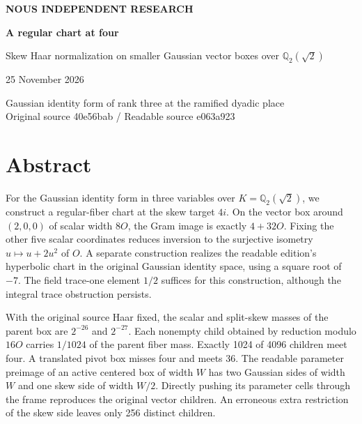 \documentclass[12pt,letterpaper]{article}
\begin{document}
\thispagestyle{empty}
\begin{center}\vspace*{.46in}
{\sffamily\small\bfseries\color{accent}NOUS INDEPENDENT RESEARCH}\par\vspace{.51in}
{\fontsize{32}{38}\selectfont\bfseries\color{ink}A regular chart at four}\par\vspace{.24in}
\begin{minipage}{.91\linewidth}\centering\Large Skew Haar normalization on smaller Gaussian vector boxes over $\mathbb Q_2(\sqrt2)$\end{minipage}
\par\vspace{.35in}
\par\vspace{.45in}{\large Justin Candler with Uriel, AI research assistant}\par 25 November 2026
\end{center}\vfill
\begin{center}\small\sffamily Gaussian identity form of rank three at the ramified dyadic place\\
Original source 40e56bab \enspace / \enspace Readable source e063a923\end{center}
\clearpage
\section*{Abstract}
For the Gaussian identity form in three variables over $K=\mathbb Q_2(\sqrt2)$, we construct a regular-fiber chart at the skew target $4i$. On the vector box around $(2,0,0)$ of scalar width $8O$, the Gram image is exactly $4+32O$. Fixing the other five scalar coordinates reduces inversion to the surjective isometry $u\mapsto u+2u^2$ of $O$. A separate construction realizes the readable edition's hyperbolic chart in the original Gaussian identity space, using a square root of $-7$. The field trace-one element $1/2$ suffices for this construction, although the integral trace obstruction persists.

With the original source Haar fixed, the scalar and split-skew masses of the parent box are $2^{-26}$ and $2^{-27}$. Each nonempty child obtained by reduction modulo $16O$ carries $1/1024$ of the parent fiber mass. Exactly 1024 of 4096 children meet four. A translated pivot box misses four and meets 36. The readable parameter preimage of an active centered box of width $W$ has two Gaussian sides of width $W$ and one skew side of width $W/2$. Directly pushing its parameter cells through the frame reproduces the original vector children. An erroneous extra restriction of the skew side leaves only 256 distinct children.
\end{document}
